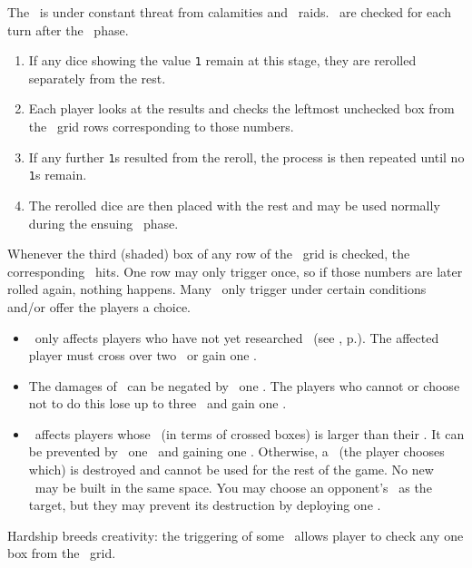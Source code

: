 The \planet\ is under constant threat from calamities and \pirate\ raids.  \disasters\ are checked for each turn after the \diplomacy\ phase.
\begin{enumerate}
  \item If any dice showing the value \texttt{1} remain at this stage, they are rerolled separately from the rest.
  \item Each player looks at the results and checks the leftmost unchecked box from the \disaster\ grid rows corresponding to those numbers.
  \item If any further \texttt{1}s resulted from the reroll, the process is then repeated until no \texttt{1}s remain.
  \item The rerolled dice are then placed with the rest and may be used normally during the ensuing \development\ phase.
\end{enumerate}
Whenever the third (shaded) box of any row of the \disaster\ grid is checked, the corresponding \disaster\ hits.  One row may only trigger once, so if those numbers are later rolled again, nothing happens.
\newline\newline
Many \disasters\ only trigger under certain conditions and/or offer the players a choice.
\begin{itemize}
  \item \pandemic\ only affects players who have not yet researched \cure\ (see , p.\pageref{sec:disasters}). The affected player must cross over two \population\ or gain one \unhappiness.
  \item The damages of \war\ can be negated by \deploying\ one \squadron.  The players who cannot or choose not to do this lose up to three \currency\ and gain one \unhappiness.
  \item \terrorism\ affects players whose \unhappiness\ (in terms of crossed boxes) is larger than their \happiness.  It can be prevented by \deploying\ one \squadron\ and gaining one \unhappiness.  Otherwise, a \fortification\ (the player chooses which) is destroyed and cannot be used for the rest of the game.  No new \fortifications\ may be built in the same space.  You may choose an opponent’s \battleship\ as the target, but they may prevent its destruction by deploying one \squadron.
\end{itemize}
Hardship breeds creativity: the triggering of some \disasters\ allows player to check any one box from the \culture\ grid.
